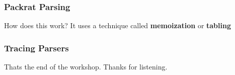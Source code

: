 \documentclass{beamer}
\begin{document}
\begin{frame}[fragile]
\frametitle{Packrat Parsing}
How does this work? It uses a technique called \textbf{memoization} or \textbf{tabling}


\end{frame}

\begin{frame}
\frametitle{Tracing Parsers}
\end{frame}

\begin{frame}
\begin{center}
Thats the end of the workshop. Thanks for listening.
\end{center}
\end{frame}
\end{document}
